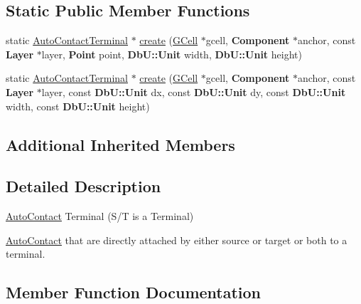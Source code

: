 \subsection*{Static Public Member Functions}
\begin{DoxyCompactItemize}
\item 
static \mbox{\hyperlink{classKatabatic_1_1AutoContactTerminal}{Auto\+Contact\+Terminal}} $\ast$ \mbox{\hyperlink{classKatabatic_1_1AutoContactTerminal_a0d440e51525b09acc843f1d345850487}{create}} (\mbox{\hyperlink{classKatabatic_1_1GCell}{G\+Cell}} $\ast$gcell, \textbf{ Component} $\ast$anchor, const \textbf{ Layer} $\ast$layer, \textbf{ Point} point, \textbf{ Db\+U\+::\+Unit} width, \textbf{ Db\+U\+::\+Unit} height)
\item 
static \mbox{\hyperlink{classKatabatic_1_1AutoContactTerminal}{Auto\+Contact\+Terminal}} $\ast$ \mbox{\hyperlink{classKatabatic_1_1AutoContactTerminal_a60a625bca2cdfebcdcc7826ab781d1bb}{create}} (\mbox{\hyperlink{classKatabatic_1_1GCell}{G\+Cell}} $\ast$gcell, \textbf{ Component} $\ast$anchor, const \textbf{ Layer} $\ast$layer, const \textbf{ Db\+U\+::\+Unit} dx, const \textbf{ Db\+U\+::\+Unit} dy, const \textbf{ Db\+U\+::\+Unit} width, const \textbf{ Db\+U\+::\+Unit} height)
\end{DoxyCompactItemize}
\subsection*{Additional Inherited Members}


\subsection{Detailed Description}
\mbox{\hyperlink{classKatabatic_1_1AutoContact}{Auto\+Contact}} Terminal (S/T is a Terminal) 

\mbox{\hyperlink{classKatabatic_1_1AutoContact}{Auto\+Contact}} that are directly attached by either source or target or both to a terminal. 

\subsection{Member Function Documentation}
\mbox{\label{classKatabatic_1_1AutoContactTerminal_a0d440e51525b09acc843f1d345850487}} 

